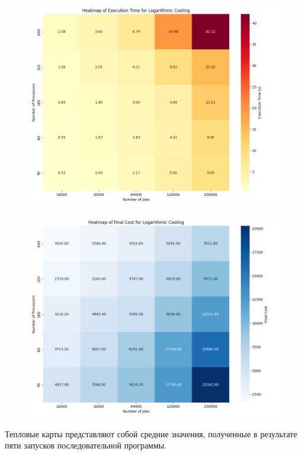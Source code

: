\documentclass[openany, twoside, a4paper, 12pt]{extbook}
\begin{document}
\begin{figure}[ht]
    \centering
    \begin{minipage}{0.49\textwidth}
        \centering
        \includegraphics[width=\textwidth]{logarithmic_cooling_heatmap_execution_time.png}
        \label{fig:image5}
    \end{minipage}
    \hfill
    \begin{minipage}{0.49\textwidth}
        \centering
        \includegraphics[width=\textwidth]{logarithmic_cooling_heatmap_final_cost.png}
        \label{fig:image6}
    \end{minipage}
\end{figure}
Тепловые карты представляют собой средние значения, полученные в результате пяти запусков последовательной программы.
\end{document}
